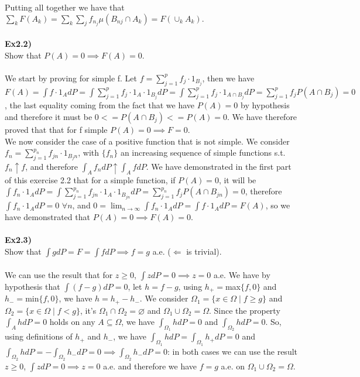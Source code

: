 \documentclass[12pt,mythesisstyle]{report}
\begin{document}
\begin{enumerate}
Putting all together we have that $\sum_k F(A_k)=\sum_k\sum_j f_{n_j}\mu(B_{nj} \cap {A_k})=F(\cup_k A_k).$
\\\\
\textbf{Ex2.2)}\\
Show that $P(A)=0\implies F(A)=0$.
\\
\\We start by proving for simple f. Let $f=\sum_{j=1}^p f_j\cdot 1_{B_j}$, then we have $F(A)=\int f\cdot 1_{A}dP=\int \sum_{j=1}^p f_j\cdot 1_A\cdot 1_{B_j}dP=\int \sum_{j=1}^p f_j\cdot 1_{A\cap B_j}dP=\sum_{j=1}^p f_jP(A\cap B_j)=0$, the last equality coming from the fact that we have $P(A)=0$ by hypothesis and therefore it must be $0<=P(A\cap B_j)<=P(A)=0$. We have therefore proved that that for f simple $P(A)=0\implies F=0$.
\\We now consider the case of a positive function that is not simple. We consider $f_n=\sum_{j=1}^{p_n} f_{jn}\cdot 1_{B_jn}$, with $\{f_n\}$ an increasing sequence of simple functions s.t. $f_n\uparrow f$, and therefore $\int_A f_ndP\uparrow\int_A fdP$. We have demonstrated in the first part of this exercise 2.2 that for a simple function, if $P(A)=0$, it will be $\int f_n\cdot 1_{A}dP=\int \sum_{j=1}^{p_n} f_{jn}\cdot 1_A\cdot 1_{B_{jn}}dP=\sum_{j=1}^{p_n} f_jP(A\cap B_{jn})=0$, therefore $\int f_n\cdot 1_{A}dP=0$ $\forall n$, and $0=\lim_{n \to \infty}\int f_n\cdot 1_{A}dP=\int f\cdot 1_{A}dP=F(A)$, so we have demonstrated that $P(A)=0\implies F(A)=0$.
\\\\
\textbf{Ex2.3)}\\
Show that $\int gdP=F=\int fdP\implies f=g$ a.e. ($\Longleftarrow$ is trivial).
\\\\
We can use the result that for $z\geq 0$, $\int zdP=0 \implies z=0$ a.e. We have by hypothesis that $\int (f-g)dP=0$, let $h=f-g$, using $h_+=$max$\{f,0\}$ and $h_-=$min$\{f,0\}$, we have $h=h_+-h_-$. We consider $\Omega_1=\{x\in\Omega \mid f\geq g\}$ and $\Omega_2=\{x\in\Omega \mid f<g\}$, it's $\Omega_1\cap\Omega_2=\varnothing$ and $\Omega_1\cup\Omega_2=\Omega$. Since the property $\int_A hdP=0$ holds on any $A\subseteq\Omega$, we have $\int_{\Omega_1} hdP=0$ and $\int_{\Omega_2} hdP=0$. So, using definitions of $h_+$ and $h_-$, we have $\int_{\Omega_1} hdP=\int_{\Omega_1} h_+dP=0$ and $\int_{\Omega_2} hdP=-\int_{\Omega_2} h_-dP=0\implies\int_{\Omega_2} h_-dP=0$: in both cases we can use the result $z\geq 0$, $\int zdP=0 \implies z=0$ a.e. and therefore we have $f=g$ a.e. on $\Omega_1\cup\Omega_2=\Omega$.

\end{enumerate}
\end{document}

